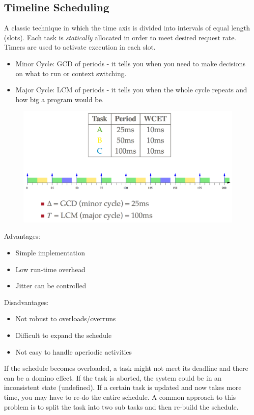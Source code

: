 \documentclass{hw}
\begin{document}
\subsection{Timeline Scheduling}
A classic technique in which the time axis is divided into intervals of equal 
length (slots). Each task is \emph{statically} allocated in order to meet
desired request rate. Timers are used to activate execution in each slot.
\begin{itemize}
  \item Minor Cycle: GCD of periods - it tells you when you need to make 
    decisions on what to run or context switching.
  \item Major Cycle: LCM of periods - it tells you when the whole cycle repeats
    and how big a program would be.
\end{itemize}
\begin{figure}[H]
  \centering
  \includegraphics[scale=.6]{img/timeline}
\end{figure}
Advantages:
\begin{itemize}
  \item Simple implementation
  \item Low run-time overhead
  \item Jitter can be controlled
\end{itemize}
Disadvantages:
\begin{itemize}
  \item Not robust to overloads/overruns
  \item Difficult to expand the schedule
  \item Not easy to handle aperiodic activities
\end{itemize}
If the schedule becomes overloaded, a task might not meet its deadline and there
can be a domino effect. If the task is aborted, the system could be in an 
inconsistent state (undefined). If a certain task is updated and now takes more
time, you may have to re-do the entire schedule. A common approach to this 
problem is to split the task into two sub tasks and then re-build the schedule.
\end{document}
